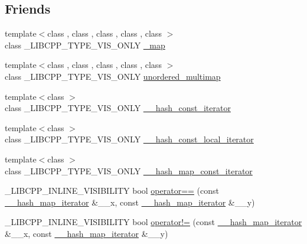\subsection*{Friends}
\begin{DoxyCompactItemize}
\item 
{\footnotesize template$<$class , class , class , class , class $>$ }\\class \+\_\+\+L\+I\+B\+C\+P\+P\+\_\+\+T\+Y\+P\+E\+\_\+\+V\+I\+S\+\_\+\+O\+N\+L\+Y \hyperlink{class____hash__map__iterator_aae80f6d0694700b968ad65123b05bb8d}{\+\_\+map}
\item 
{\footnotesize template$<$class , class , class , class , class $>$ }\\class \+\_\+\+L\+I\+B\+C\+P\+P\+\_\+\+T\+Y\+P\+E\+\_\+\+V\+I\+S\+\_\+\+O\+N\+L\+Y \hyperlink{class____hash__map__iterator_a10e575a91277f87c87f667fc1d2672eb}{unordered\+\_\+multimap}
\item 
{\footnotesize template$<$class $>$ }\\class \+\_\+\+L\+I\+B\+C\+P\+P\+\_\+\+T\+Y\+P\+E\+\_\+\+V\+I\+S\+\_\+\+O\+N\+L\+Y \hyperlink{class____hash__map__iterator_aa83445397abeb5cadc338a3b84306aa3}{\+\_\+\+\_\+hash\+\_\+const\+\_\+iterator}
\item 
{\footnotesize template$<$class $>$ }\\class \+\_\+\+L\+I\+B\+C\+P\+P\+\_\+\+T\+Y\+P\+E\+\_\+\+V\+I\+S\+\_\+\+O\+N\+L\+Y \hyperlink{class____hash__map__iterator_a7f9b280728e4a73bb8c94808def95e7f}{\+\_\+\+\_\+hash\+\_\+const\+\_\+local\+\_\+iterator}
\item 
{\footnotesize template$<$class $>$ }\\class \+\_\+\+L\+I\+B\+C\+P\+P\+\_\+\+T\+Y\+P\+E\+\_\+\+V\+I\+S\+\_\+\+O\+N\+L\+Y \hyperlink{class____hash__map__iterator_affbd964c4dd74204e8c3124b49ac5519}{\+\_\+\+\_\+hash\+\_\+map\+\_\+const\+\_\+iterator}
\item 
\+\_\+\+L\+I\+B\+C\+P\+P\+\_\+\+I\+N\+L\+I\+N\+E\+\_\+\+V\+I\+S\+I\+B\+I\+L\+I\+T\+Y bool \hyperlink{class____hash__map__iterator_a5534d558226d3cceed535b5cbe70a0f1}{operator==} (const \hyperlink{class____hash__map__iterator}{\+\_\+\+\_\+hash\+\_\+map\+\_\+iterator} \&\+\_\+\+\_\+x, const \hyperlink{class____hash__map__iterator}{\+\_\+\+\_\+hash\+\_\+map\+\_\+iterator} \&\+\_\+\+\_\+y)
\item 
\+\_\+\+L\+I\+B\+C\+P\+P\+\_\+\+I\+N\+L\+I\+N\+E\+\_\+\+V\+I\+S\+I\+B\+I\+L\+I\+T\+Y bool \hyperlink{class____hash__map__iterator_a47c549da239ab29cc2ac7a7c1efbdc91}{operator!=} (const \hyperlink{class____hash__map__iterator}{\+\_\+\+\_\+hash\+\_\+map\+\_\+iterator} \&\+\_\+\+\_\+x, const \hyperlink{class____hash__map__iterator}{\+\_\+\+\_\+hash\+\_\+map\+\_\+iterator} \&\+\_\+\+\_\+y)

\end{DoxyCompactItemize}

